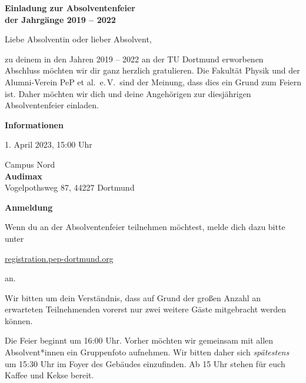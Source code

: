 \documentclass[parskip=half, fontsize=10pt, paper=a5]{scrartcl}
\begin{document}
\raggedright


\begin{center}
\textbf{\Large Einladung zur Absolventenfeier\\ der Jahrgänge 2019 – 2022}
\end{center}
\vspace{0.5cm}

Liebe Absolventin oder lieber Absolvent,

zu deinem in den Jahren 2019 – 2022 an der TU Dortmund erworbenen Abschluss möchten
wir dir ganz herzlich gratulieren.
Die Fakultät Physik und der Alumni-Verein PeP et al.\ e.\,V.\ sind der Meinung, dass dies ein Grund zum Feiern ist.
Daher möchten wir dich und deine Angehörigen zur diesjährigen Absolventenfeier einladen.

\vspace{0.25cm}
\textcolor{tu}{\textbf{\large Informationen}}
\begin{description}[style=multiline, leftmargin=5em]
  \item[Wann] 1. April 2023, 15:00 Uhr
  \item[Wo] Campus Nord\\
    \textbf{Audimax}\\
    Vogelpothsweg 87, 44227 Dortmund
\end{description}

\vspace{0.25cm}
\textcolor{tu}{\textbf{\large Anmeldung}}

Wenn du an der Absolventenfeier teilnehmen möchtest, melde dich dazu bitte unter
\begin{center}
  \large
  \href{https://registration.pep-dortmund.org/events/absol23/registration}{registration.pep-dortmund.org} 
\end{center}
an.

Wir bitten um dein Verständnis, dass auf Grund der großen Anzahl an erwarteten Teilnehmenden vorerst nur zwei weitere
Gäste mitgebracht werden können.

Die Feier beginnt um 16:00 Uhr. Vorher möchten wir gemeinsam mit allen Absolvent*innen ein Gruppenfoto aufnehmen.
Wir bitten daher sich \emph{spätestens} um 15:30 Uhr im Foyer des Gebäudes einzufinden.
Ab 15 Uhr stehen für euch Kaffee und Kekse bereit.
\end{document}
